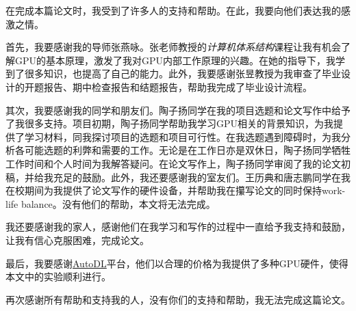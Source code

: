 
\begin{acknowledgements}

在完成本篇论文时，我受到了许多人的支持和帮助。在此，我要向他们表达我的感激之情。

首先，我要感谢我的导师张燕咏。张老师教授的\emph{计算机体系结构}课程让我有机会了解GPU的基本原理，激发了我对GPU内部工作原理的兴趣。在她的指导下，我学到了很多知识，也提高了自己的能力。此外，我要感谢张昱教授为我审查了毕业设计的开题报告、期中检查报告和结题报告，帮助我完成了毕业设计流程。

其次，我要感谢我的同学和朋友们。陶子扬同学在我的项目选题和论文写作中给予了我很多支持。项目初期，陶子扬同学帮助我学习GPU相关的背景知识，为我提供了学习材料，同我探讨项目的选题和项目可行性。在我选题遇到障碍时，为我分析各可能选题的利弊和需要的工作。无论是在工作日亦是双休日，陶子扬同学牺牲工作时间和个人时间为我解答疑问。在论文写作上，陶子扬同学审阅了我的论文初稿，并给我充足的鼓励。此外，我还要感谢我的室友们。王历典和唐志鹏同学在我在校期间为我提供了论文写作的硬件设备，并帮助我在攥写论文的同时保持work-life balance。没有他们的帮助，本文将无法完成。

我还要感谢我的家人，感谢他们在我学习和写作的过程中一直给予我支持和鼓励，让我有信心克服困难，完成论文。

最后，我要感谢\href{https://www.autodl.com/home}{AutoDL}平台，他们以合理的价格为我提供了多种GPU硬件，使得本文中的实验顺利进行。

再次感谢所有帮助和支持我的人，没有你们的支持和帮助，我无法完成这篇论文。

\end{acknowledgements}
